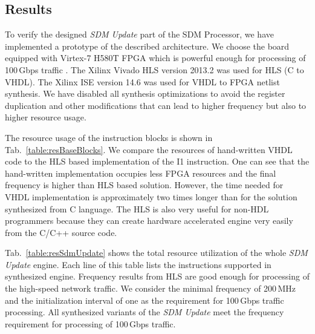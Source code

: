 \subsection{Results}
\label{sec:results}
To verify the designed \textit{SDM Update} part of the SDM Processor, we have implemented a prototype of the described architecture. 
We choose the board equipped with Virtex-7 H580T FPGA which is powerful enough for processing of 100\,Gbps traffic \cite{combo-100g}.
The Xilinx Vivado HLS version 2013.2 was used for HLS (C to VHDL).
The Xilinx ISE version 14.6 was used for VHDL to FPGA netlist synthesis.
We have disabled all synthesis optimizations to avoid the register duplication and other modifications that can lead to higher 
frequency but also to higher resource usage. 

The resource usage of the instruction blocks is shown in Tab.~\ref{table:resBaseBlocks}.
We compare the resources of hand-written VHDL code to the HLS based implementation of the I1 instruction.
One can see that the hand-written implementation
occupies less FPGA resources and the final frequency is higher than HLS based solution. 
However, the time needed for VHDL implementation is approximately two times longer than for the solution synthesized from C language. 
The HLS is also very useful for non-HDL programmers because they can create hardware accelerated engine very easily from
the C/C++ source code. 

Tab.~\ref{table:resSdmUpdate} shows the total resource utilization of the whole \textit{SDM Update} engine. 
Each line of this table lists the instructions supported in synthesized engine.
Frequency results from HLS are good enough for processing of the high-speed network traffic.
We consider the minimal frequency of 200\,MHz and the initialization interval of one as the requirement for 100\,Gbps traffic processing.
All synthesized variants of the \textit{SDM Update} meet the frequency requirement for processing of 100\,Gbps traffic. 

